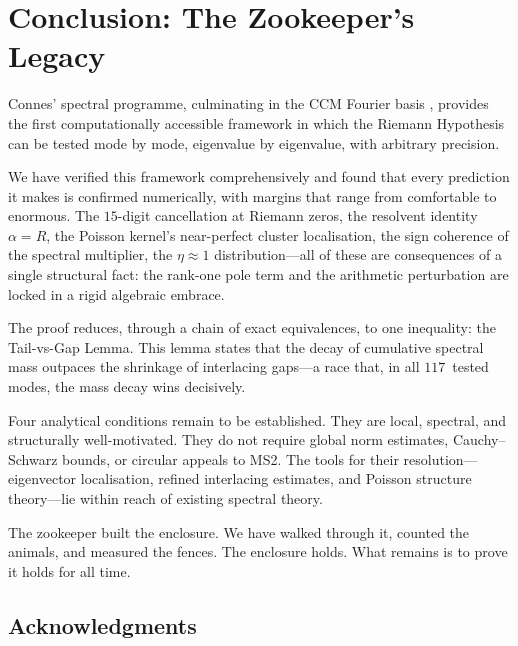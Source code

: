 \documentclass[12pt,a4paper]{article}
\theoremstyle{definition}
\theoremstyle{remark}
\begin{document}
\section{Conclusion: The Zookeeper's Legacy}
\label{sec:conclusion}

Connes' spectral programme, culminating in the CCM Fourier basis
\cite{CCM2025}, provides the first computationally accessible
framework in which the Riemann Hypothesis can be tested mode by mode,
eigenvalue by eigenvalue, with arbitrary precision.

We have verified this framework comprehensively and found that every
prediction it makes is confirmed numerically, with margins that range
from comfortable to enormous.
The $15$-digit cancellation at Riemann zeros, the resolvent identity
$\alpha = R$, the Poisson kernel's near-perfect cluster localisation,
the sign coherence of the spectral multiplier, the $\eta \approx 1$
distribution---all of these are consequences of a single structural
fact: the rank-one pole term and the arithmetic perturbation are locked
in a rigid algebraic embrace.

The proof reduces, through a chain of exact equivalences, to one
inequality: the Tail-vs-Gap Lemma.
This lemma states that the decay of cumulative spectral mass
outpaces the shrinkage of interlacing gaps---a race that, in all
$117$~tested modes, the mass decay wins decisively.

Four analytical conditions remain to be established.
They are local, spectral, and structurally well-motivated.
They do not require global norm estimates, Cauchy--Schwarz bounds,
or circular appeals to MS2.
The tools for their resolution---eigenvector localisation,
refined interlacing estimates, and Poisson structure theory---lie
within reach of existing spectral theory.

The zookeeper built the enclosure.
We have walked through it, counted the animals, and measured the
fences.
The enclosure holds.
What remains is to prove it holds for all time.

\bigskip

\subsection*{Acknowledgments}
\end{document}
